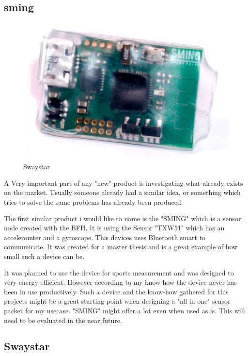 \subsection{sming}

\begin{figure}
  \begin{center}
\includegraphics[width=\linewidth]{images/sming_pic2.jpg}
  \end{center}
  \caption{\label{fig:swaystar}Swaystar}
\end{figure}
A Very important part of any "new" product is investigating what already exists on the market.
Usually someone already had a similar idea, or something which tries to solve the same problems has already been produced. 

The first similar product i would like to name is the "SMING" which is a sensor node created with the BFH. 
It is using the Sensor "TXW51" which has an acceleromter and a gyroscope. This devices uses Bluetooth smart to communicate. It was created for a master thesis and is a great example of how small such a device can be. 

It was planned to use the device for sports measurement and was designed to very energy efficient. However according to my know-how the device never has been in use productively. \cite{sming:book}
Such a device and the know-how gathered for this projects might be a great starting point when designing a "all in one" sensor packet for my usecase. "SMING" might offer a lot even when used as is. This will need to be evaluated in the near future.

\subsection{Swaystar}

